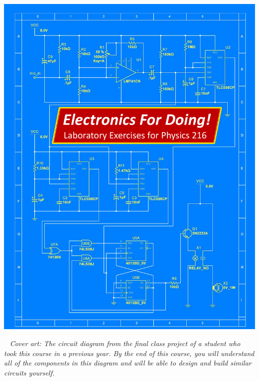 \thispagestyle{empty}

\begin{center}
\includegraphics[width=8.44in]{electronics_front_pages/electronics_front_cover_kuri_optimized.pdf}
\end{center}
\newpage

\restoregeometry
\restorepagecolor
\thispagestyle{empty}

\
\vfill
\textit{Cover art: The circuit diagram from the final class project of a student who took this course in a previous year.  By the end of this course, you will understand all of the components in this diagram and will be able to design and build similar circuits  yourself.}
\pagebreak



